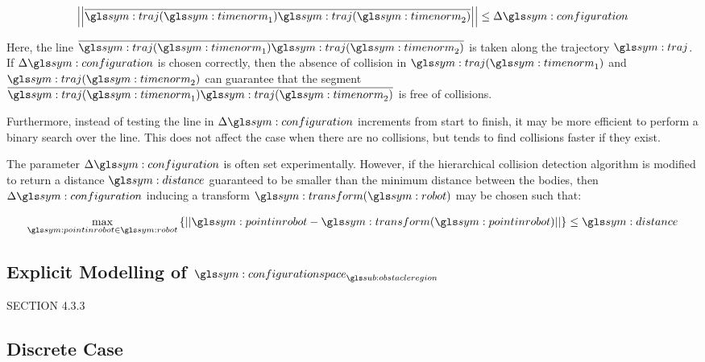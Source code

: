 				\begin{equation}
					\norm
					{%
						\vecline
						{%
							\traj(\timenorm_1)
						}
						{%
							\traj(\timenorm_2)
						}
					}
					\leq
					\Delta\configuration
				\end{equation}

				Here, the line
				\(
					\vecline
					{%
						\traj(\timenorm_1)
					}
					{%
						\traj(\timenorm_2)
					}
				\)
				is taken along the trajectory $\traj$. If
				$\Delta\configuration$ is chosen correctly, then the absence of
				collision in $\traj(\timenorm_1)$ and $\traj(\timenorm_2)$ can
				guarantee that the segment
				\(
					\vecline
					{%
						\traj(\timenorm_1)
					}
					{%
						\traj(\timenorm_2)
					}
				\)
				is free of collisions.

				Furthermore, instead
				of testing the line in $\Delta\configuration$ increments from
				start to finish, it may be more efficient to perform a binary
				search over the line. This does not affect the case when there
				are no collisions, but tends to find collisions faster if they
				exist.

				The parameter $\Delta\configuration$ is often set
				experimentally. However, if the hierarchical collision detection
				algorithm is modified to return a distance $\distance$
				guaranteed to be smaller than the minimum distance between the
				bodies, then $\Delta\configuration$ inducing a transform
				$\transform(\robot)$ may be chosen such that:

				\begin{equation}
					\max_{\pointinrobot\in\robot}
					\left\{%
						\norm
						{%
							\pointinrobot - \transform(\pointinrobot)
						}
					\right\}
					\leq
					\distance
				\end{equation}

	\subsection{Explicit Modelling of $\configurationspace_{\obstacleregion}$}%
	\label{sec:explicit_modelling_of_obstacle_region_configuration_space}

		SECTION 4.3.3

	\subsection{Discrete Case}%
	\label{sec:discrete_case}


